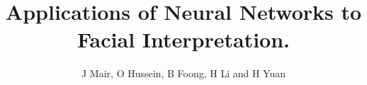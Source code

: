 \documentclass[%
 reprint,
 amsmath,amssymb,
 aps,
]{revtex4-1}
\begin{document}
\title{{\LARGE \bf
Applications of Neural Networks to Facial Interpretation.}
}

\author{J Mair,  O Hussein, B Foong, H Li and H Yuan%
}



\maketitle
\thispagestyle{empty}
\pagestyle{empty}




\end{document}
